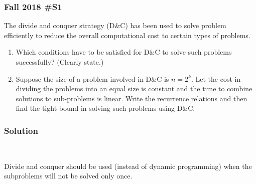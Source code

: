 \subsubsection{Fall 2018 \#S1}

	The divide and conquer strategy (D\&C) has been used to solve problem efficiently to reduce the overall computational cost to certain types of problems.
	\begin{enumerate}[label=\alph*.]
		\item Which conditions have to be satisfied for D\&C to solve such problems successfully?  (Clearly state.)
		\item Suppose the size of a problem involved in D\&C is $n=2^k$.  Let the cost in dividing the problems into an equal size is constant and the time to combine solutions to sub-problems is linear.  Write the recurrence relations and then find the tight bound in solving such problems using D\&C.  
	\end{enumerate}
	
\subsubsection{Solution} \

Divide and conquer should be used (instead of dynamic programming) when the subproblems will not be solved only once.  

